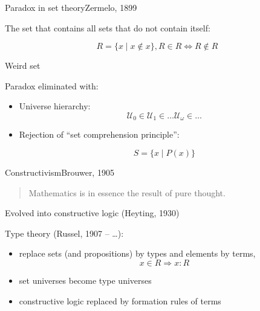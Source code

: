 \documentclass[english,handout]{beamer}
\begin{document}
\begin{frame}{Paradox in set theory}{Zermelo, 1899}

The set that contains all sets that do not contain itself:


    \[ R = \{x \mid x \not \in x \}, R\in R \Leftrightarrow R \not \in R \]
    
Weird set
    
    \pause
    
    Paradox eliminated with:
    \begin{itemize}
    \item Universe hierarchy:
        \[\mathcal{U}_0 \in \mathcal{U}_1 \in \ldots \mathcal{U}_{\omega} \in \ldots \]
        
    \item Rejection of ``set comprehension principle'':
    
    \[ S = \{ x \mid P (x ) \} \]
    \end{itemize}
    
    
\end{frame}

\begin{frame}{Constructivism}{Brouwer, 1905}

\begin{quotation}
Mathematics is in essence the result of pure thought.
\end{quotation}

Evolved into constructive logic (Heyting, 1930)

\pause

Type theory (Russel, 1907 -- \ldots):

\begin{itemize}
\item replace sets (and propositions) by types and elements by terms, $$x \in R \Rightarrow x : R$$
\item set universes become type universes
\item constructive logic replaced by formation rules of terms
\end{itemize}

\end{frame}


%     
%             
%     
%             
%     
\end{document}
